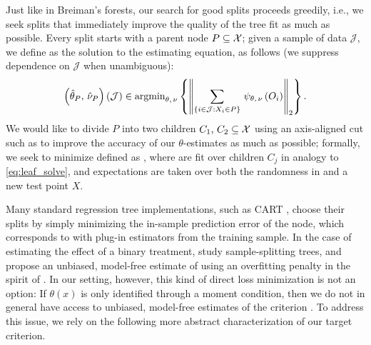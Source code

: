 \documentclass[aos]{imsart}
\theoremstyle{plain}
\theoremstyle{definition}
\theoremstyle{remark}
\begin{document}
\begin{CJK}{UTF8}{gbsn}
Just like in Breiman's forests, our search for good splits proceeds greedily, i.e., we seek splits that
immediately improve the quality of the tree fit as much as possible.
Every split starts with a parent node $P \subseteq \mathcal{X}$; given a sample of data $\mathcal{J}$, we define
 as the solution to the estimating equation, as follows
(we suppress dependence on $\mathcal{J}$ when unambiguous):
\begin{equation}
\label{eq:leaf_solve}
\p{\htheta_P, \, \hnu_P}(\mathcal{J}) \in \argmin_{\theta, \, \nu} \cb{\Norm{\sum_{\cb{i\in\mathcal{J} : X_i \in P}} \, \psi_{\theta, \, \nu}\p{O_i}}_2}.
\end{equation}
We would like to divide $P$ into two children $C_1, \, C_2 \subseteq \mathcal{X}$ using an axis-aligned
cut such as to improve the accuracy of our $\theta$-estimates as much as possible;
formally, we seek to minimize  defined as
 ,
where  are fit over children $C_j$ in analogy to \eqref{eq:leaf_solve},
and expectations are taken over both the randomness in  and a
new test point $X$.

Many standard regression tree implementations, such as CART \citep{breiman1984classification},
choose their splits by simply minimizing the in-sample prediction error of the node, which corresponds to 
 with plug-in estimators from the training sample. 
In the case of estimating the effect of a binary treatment,
\citet{athey2016recursive} study sample-splitting trees, and
propose an unbiased, model-free estimate of   using
an overfitting penalty in the spirit of \citet{mallows1973some}.
In our setting, however, this kind of direct loss minimization is not an option: If $\theta(x)$ is only
identified through a moment condition, then we do not in general have access to unbiased,
model-free estimates of the criterion  . To address this issue, we
rely on the following more abstract characterization of our target criterion. 


\end{CJK}
\end{document}
